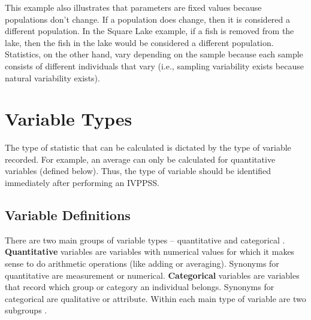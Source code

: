 \documentclass[10pt,openany]{book}\usepackage[]{graphicx}\usepackage[]{color}
\begin{document}

This example also illustrates that parameters are fixed values because populations don't change. If a population does change, then it is considered a different population. In the Square Lake example, if a fish is removed from the lake, then the fish in the lake would be considered a different population. Statistics, on the other hand, vary depending on the sample because each sample consists of different individuals that vary (i.e., sampling variability exists because natural variability exists).



\clearpage
\section{Variable Types}\label{sect:VarTypes}
The type of statistic that can be calculated is dictated by the type of variable recorded. For example, an average can only be calculated for quantitative variables (defined below). Thus, the type of variable should be identified immediately after performing an IVPPSS.

\subsection{Variable Definitions}
There are two main groups of variable types -- quantitative and categorical . \textbf{Quantitative} variables are variables with numerical values for which it makes sense to do arithmetic operations (like adding or averaging).  Synonyms for quantitative are measurement or numerical. \textbf{Categorical} variables are variables that record which group or category an individual belongs.  Synonyms for categorical are qualitative or attribute. Within each main type of variable are two subgroups .
\end{document}
